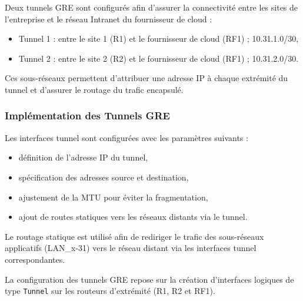 \documentclass[12pt,a4paper, oneside]{memoir}
\begin{document}
Deux tunnels GRE sont configurés afin d’assurer la connectivité entre les sites de l’entreprise et le réseau Intranet du fournisseur de cloud :

\begin{itemize}
	\item Tunnel 1 : entre le site 1 (R1) et le fournisseur de cloud (RF1) ; 10.31.1.0/30,
	\item Tunnel 2 : entre le site 2 (R2) et le fournisseur de cloud (RF1) ;  10.31.2.0/30.
\end{itemize}

Ces sous-réseaux permettent d’attribuer une adresse IP à chaque extrémité du tunnel et d’assurer le routage du trafic encapsulé.

\subsubsection{Implémentation des Tunnels GRE}
Les interfaces tunnel sont configurées avec les paramètres suivants :
\begin{itemize}
	\item définition de l’adresse IP du tunnel,
	\item spécification des adresses source et destination,
	\item ajustement de la MTU pour éviter la fragmentation,
	\item ajout de routes statiques vers les réseaux distants via le tunnel.
\end{itemize}

Le routage statique est utilisé afin de rediriger le trafic des sous-réseaux applicatifs (LAN\_x-31) vers le réseau distant via les interfaces tunnel correspondantes.


La configuration des tunnels GRE repose sur la création d’interfaces logiques de type \texttt{Tunnel} sur les routeurs d’extrémité (R1, R2 et RF1).
\end{document}
